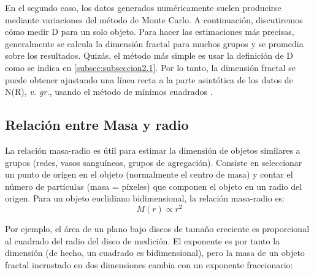 \documentclass[11pt]{article}
\begin{document}
  En el segundo caso, los datos generados num\'{e}ricamente suelen producirse mediante variaciones del m\'{e}todo de Monte Carlo. A continuaci\'{o}n, discutiremos c\'{o}mo medir D para un solo objeto. Para hacer las estimaciones m\'{a}s precisas, generalmente se calcula la dimensi\'{o}n fractal para muchos grupos y se promedia sobre los resultados. Quiz\'{a}s, el m\'{e}todo m\'{a}s simple es usar la definici\'{o}n de  D como se indica en \ref{subsec:subseccion2.1}. Por lo tanto, la dimensi\'{o}n fractal se puede obtener ajustando una l\'{i}nea recta a la parte asint\'{o}tica de los datos de  N(R), \textit{v. gr.}, usando el m\'{e}todo de m\'{i}nimos cuadrados \cite{Vicsek1992}.
  
  

\subsection{Relaci\'{o}n entre Masa y radio}

La relaci\'{o}n masa-radio es \'{u}til para estimar la dimensi\'{o}n de objetos similares a grupos (redes, vasos sangu\'{i}neos, grupos de agregaci\'{o}n). Consiste en seleccionar un punto de origen en el objeto (normalmente el centro de masa) y contar el n\'{u}mero de part\'{i}culas (masa = p\'{i}xeles) que componen el objeto en un radio del origen. Para un objeto euclidiano bidimensional, la relaci\'{o}n masa-radio es:
\begin{equation}
M(r) \propto r^{2}
\end{equation}

Por ejemplo, el \'{a}rea de un plano bajo discos de tamaño creciente es proporcional al cuadrado del radio del disco de medici\'{o}n. El exponente es por tanto la dimensi\'{o}n (de hecho, un cuadrado es bidimensional), pero la masa de un objeto fractal incrustado en dos dimensiones cambia con un exponente fraccionario:
\end{document}

